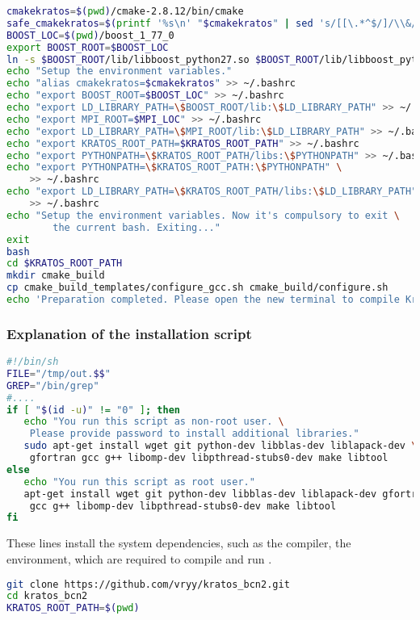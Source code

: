 \documentclass[12pt,a4paper,twoside]{article}
\begin{document}
\begin{lstlisting}[language=bash, basicstyle=\footnotesize, frame=single]
cmakekratos=$(pwd)/cmake-2.8.12/bin/cmake
safe_cmakekratos=$(printf '%s\n' "$cmakekratos" | sed 's/[[\.*^$/]/\\&/g')
BOOST_LOC=$(pwd)/boost_1_77_0
export BOOST_ROOT=$BOOST_LOC
ln -s $BOOST_ROOT/lib/libboost_python27.so $BOOST_ROOT/lib/libboost_python.so
echo "Setup the environment variables."
echo "alias cmakekratos=$cmakekratos" >> ~/.bashrc
echo "export BOOST_ROOT=$BOOST_LOC" >> ~/.bashrc
echo "export LD_LIBRARY_PATH=\$BOOST_ROOT/lib:\$LD_LIBRARY_PATH" >> ~/.bashrc
echo "export MPI_ROOT=$MPI_LOC" >> ~/.bashrc
echo "export LD_LIBRARY_PATH=\$MPI_ROOT/lib:\$LD_LIBRARY_PATH" >> ~/.bashrc
echo "export KRATOS_ROOT_PATH=$KRATOS_ROOT_PATH" >> ~/.bashrc
echo "export PYTHONPATH=\$KRATOS_ROOT_PATH/libs:\$PYTHONPATH" >> ~/.bashrc
echo "export PYTHONPATH=\$KRATOS_ROOT_PATH:\$PYTHONPATH" \
	>> ~/.bashrc
echo "export LD_LIBRARY_PATH=\$KRATOS_ROOT_PATH/libs:\$LD_LIBRARY_PATH" \
	>> ~/.bashrc
echo "Setup the environment variables. Now it's compulsory to exit \
		the current bash. Exiting..."
exit
bash
cd $KRATOS_ROOT_PATH
mkdir cmake_build
cp cmake_build_templates/configure_gcc.sh cmake_build/configure.sh
echo 'Preparation completed. Please open the new terminal to compile Kratos.'
\end{lstlisting}

\subsubsection{Explanation of the installation script}

\begin{lstlisting}[language=bash, basicstyle=\footnotesize, frame=single]
#!/bin/sh
FILE="/tmp/out.$$"
GREP="/bin/grep"
#....
if [ "$(id -u)" != "0" ]; then
   echo "You run this script as non-root user. \
   	Please provide password to install additional libraries."
   sudo apt-get install wget git python-dev libblas-dev liblapack-dev \
   	gfortran gcc g++ libomp-dev libpthread-stubs0-dev make libtool
else
   echo "You run this script as root user."
   apt-get install wget git python-dev libblas-dev liblapack-dev gfortran \
   	gcc g++ libomp-dev libpthread-stubs0-dev make libtool
fi
\end{lstlisting}

These lines install the system dependencies, such as the compiler, the \python environment, which are required to compile and run \kratos.

\begin{lstlisting}[language=bash, basicstyle=\footnotesize, frame=single]
git clone https://github.com/vryy/kratos_bcn2.git
cd kratos_bcn2
KRATOS_ROOT_PATH=$(pwd)
\end{lstlisting}
\end{document}
